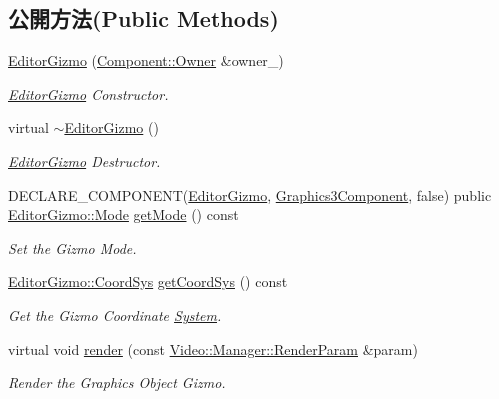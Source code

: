 \subsection*{公開方法(Public Methods)}
\begin{DoxyCompactItemize}
\item 
\hyperlink{class_magnum_1_1_editor_gizmo_a062469ef365f32c44d73956042078c1a}{Editor\+Gizmo} (\hyperlink{class_magnum_1_1_component_1_1_owner}{Component\+::\+Owner} \&owner\+\_\+)
\begin{DoxyCompactList}\small\item\em \hyperlink{class_magnum_1_1_editor_gizmo}{Editor\+Gizmo} Constructor. \end{DoxyCompactList}\item 
virtual \hyperlink{class_magnum_1_1_editor_gizmo_a1cb32e3c3f7fee6c1e2d7cc10a14718e}{$\sim$\+Editor\+Gizmo} ()
\begin{DoxyCompactList}\small\item\em \hyperlink{class_magnum_1_1_editor_gizmo}{Editor\+Gizmo} Destructor. \end{DoxyCompactList}\item 
D\+E\+C\+L\+A\+R\+E\+\_\+\+C\+O\+M\+P\+O\+N\+E\+NT(\hyperlink{class_magnum_1_1_editor_gizmo}{Editor\+Gizmo}, \hyperlink{class_magnum_1_1_graphics3_component}{Graphics3\+Component}, false) public \hyperlink{class_magnum_1_1_editor_gizmo_aaefa18accae0eb2c9c670b0f8c5a375c}{Editor\+Gizmo\+::\+Mode} \hyperlink{class_magnum_1_1_editor_gizmo_a821b3f473c337fb4175ba956caa46509}{get\+Mode} () const 
\begin{DoxyCompactList}\small\item\em Set the Gizmo Mode. \end{DoxyCompactList}\item 
\hyperlink{class_magnum_1_1_editor_gizmo_ac5e0cb8d26cb03df33fe145a7b3ef910}{Editor\+Gizmo\+::\+Coord\+Sys} \hyperlink{class_magnum_1_1_editor_gizmo_a985277780cbf46f6a7f0c9e822b0c47a}{get\+Coord\+Sys} () const 
\begin{DoxyCompactList}\small\item\em Get the Gizmo Coordinate \hyperlink{class_magnum_1_1_system}{System}. \end{DoxyCompactList}\item 
virtual void \hyperlink{class_magnum_1_1_editor_gizmo_a85dc05a2eb5c2b8e1f8e623d9f82a891}{render} (const \hyperlink{class_magnum_1_1_video_1_1_manager_1_1_render_param}{Video\+::\+Manager\+::\+Render\+Param} \&param)
\begin{DoxyCompactList}\small\item\em Render the Graphics Object Gizmo. \end{DoxyCompactList}\item 

\end{DoxyCompactItemize}
